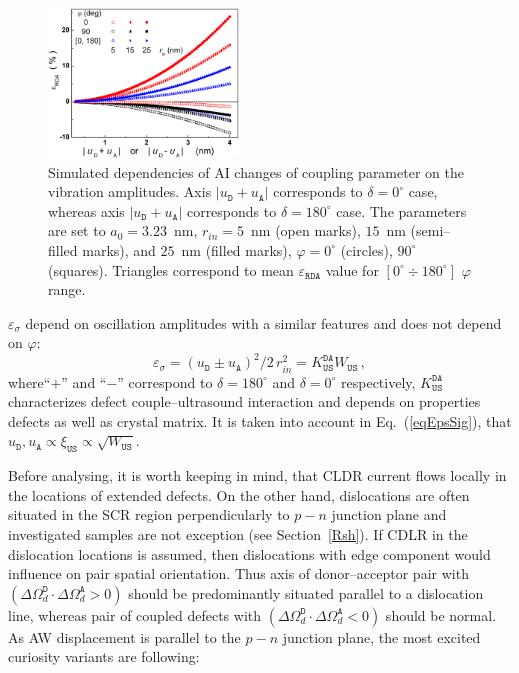 \documentclass[aip,jap, amsmath,amssymb,reprint]{revtex4-1}
\begin{document}
\begin{figure}
\includegraphics[width=0.45\textwidth]{olikhFig5}%
\caption{\label{fig_Erda}
Simulated dependencies of AI changes of coupling parameter on the vibration amplitudes.
Axis $|u_\mathtt{D}+u_\mathtt{A}|$ corresponds to $\delta=0^\circ$ case, whereas axis $|u_\mathtt{D}+u_\mathtt{A}|$ corresponds to $\delta=180^\circ$ case.
The parameters are set to $a_0=3.23$~nm,
$r_{in}=5$~nm (open marks), $15$~nm (semi--filled marks), and $25$~nm (filled marks),
$\varphi=0^\circ$ (circles), $90^\circ$ (squares).
Triangles correspond to mean $\varepsilon_{\mathtt{RDA}}$ value for $[0^\circ\div 180^\circ]$ $\varphi$ range.
}%
\end{figure}

$\varepsilon_{\sigma}$ depend on oscillation amplitudes with a similar features and
does not depend on $\varphi$:
\begin{equation}
\label{eqEpsSig}
\varepsilon_{\sigma}=(u_\mathtt{D}\pm u_\mathtt{A})^2/2\,r_{in}^2=K_\mathtt{US}^\mathtt{DA}W_{\mathtt{US}}\,,
\end{equation}
where``$+$'' and ``$-$'' correspond to $\delta=180^\circ$ and $\delta=0^\circ$ respectively,
$K_\mathtt{US}^\mathtt{DA}$ characterizes defect couple--ultrasound interaction and depends on properties defects as well as crystal matrix.
It is taken into account in Eq.~(\ref{eqEpsSig}), that $u_\mathtt{D},u_\mathtt{A}\propto \xi_\mathtt{US}\propto\sqrt{W_\mathtt{US}}$.

Before analysing, it is worth keeping in mind, that
CLDR current flows locally in the locations of extended defects\cite{CDLR:JAP,CDLR:SSP}.
On the other hand, dislocations are often situated in the SCR region perpendicularly to $p-n$ junction plane
and investigated samples are not exception (see Section~\ref{Rsh}).
If CDLR in the dislocation locations is assumed, then dislocations with edge component would influence on pair spatial orientation.
Thus axis of donor--acceptor pair with $(\Delta\Omega_d^\mathtt{D}\cdot\Delta\Omega_d^\mathtt{A}>0)$  should be predominantly situated parallel to a dislocation line,
whereas pair of coupled defects with $(\Delta\Omega_d^\mathtt{D}\cdot\Delta\Omega_d^\mathtt{A}<0)$ should be normal.
As AW displacement is parallel to the $p-n$ junction plane,
the most excited curiosity variants are following:
\end{document}
